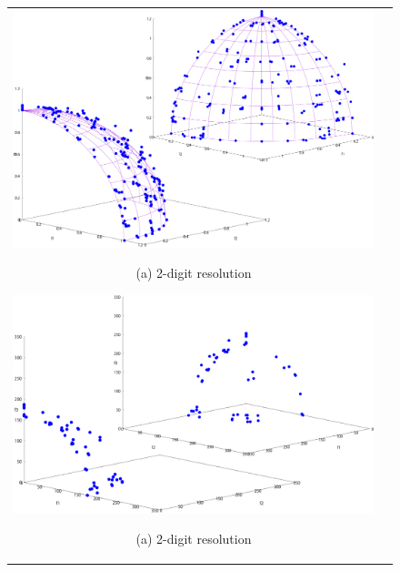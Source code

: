 \documentclass[../main/main]{subfiles}
\begin{document}
\begin{figure}[htbp]
\begin{tabular}{cc}
\begin{minipage}{0.32\hsize}
\includegraphics[width=1\linewidth]{../figures/MOEAD/DTLZ2_digi2_double.pdf}
\begin{center}
{\footnotesize (a) 2-digit resolution}
\end{center}
\end{minipage}
\begin{minipage}{0.32\hsize}
\includegraphics[width=1\linewidth]{../figures/MOEAD/DTLZ3_digi2_double.pdf}
\begin{center}
{\footnotesize (a) 2-digit resolution}
\end{center}
\end{minipage}
\begin{minipage}{0.32\hsize}

\end{minipage}
\end{tabular}
\end{figure}
\end{document}
